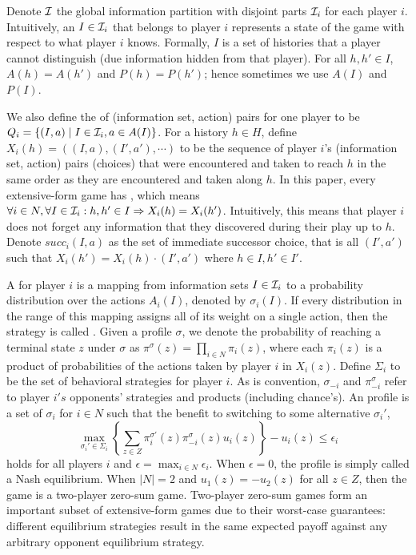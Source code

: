 \documentclass{aamas2014}
\begin{document}
Denote $\mathcal{I}$ the global information partition with disjoint parts $\mathcal{I}_i$ for each player $i$. Intuitively, an  
$I \in \mathcal{I}_i$ that belongs to player $i$ represents a state of the game with respect to what player $i$ knows. 
Formally, $I$ is a set of histories that a player cannot distinguish (due information hidden from that player). For all 
$h,h' \in I$, $A(h) = A(h')$ and $P(h) = P(h')$; hence sometimes we use $A(I)$ and $P(I)$. 

We also define the  of (information set, action) pairs for one player to be
$Q_i = \{ (I,a) \mid I \in \mathcal{I}_i, a \in A(I) \}$.
For a history $h \in H$, define
$X_i(h) = ((I,a), (I', a'), \cdots)$ to be the sequence of player $i$'s (information set,
action) pairs (choices) that were encountered and taken to reach $h$ in the same order as they are encountered
and taken along $h$. In this paper, every extensive-form game has , which means
$\forall i \in N, \forall I \in \mathcal{I}_i : h, h' \in I \Rightarrow X_i(h) = X_i(h')$. Intuitively,
this means that player $i$ does not forget any information that they discovered during their play
up to $h$. 
Denote $succ_i(I,a)$ as the set of immediate successor choice, that is 
all $(I',a')$ such that $X_i(h') = X_i(h) \cdot (I',a')$ where $h \in I, h' \in I'$.

A  for player $i$ is a mapping from information sets $I \in \mathcal{I}_i$
to a probability distribution over the actions $A_i(I)$, denoted by $\sigma_i(I)$. 
If every distribution in the range of this mapping assigns all of its weight on a single action, 
then the strategy is called . 
Given a profile $\sigma$, we denote the probability of reaching a terminal state $z$ under $\sigma$ as 
$\pi^\sigma(z) = \prod_{i \in N} \pi_i(z)$, where each $\pi_i(z)$ is a product of probabilities of the actions taken 
by player $i$ in $X_i(z)$. Define $\Sigma_i$ to be the set of behavioral strategies for player $i$. 
As is convention, $\sigma_{-i}$ and $\pi_{-i}^\sigma$ refer to player $i's$ opponents' strategies and products (including chance's).
An  profile is a set of $\sigma_i$ for $i \in N$ such that the benefit to switching to some 
alternative $\sigma_i'$,
\begin{equation}\label{eq:ne}
  \max_{\sigma_i' \in \Sigma_i} \left\{ \sum_{z \in Z} \pi_i^{\sigma'}(z) \pi_{-i}^\sigma(z) u_i(z) \right\} - u_i(z) \le \epsilon_i
\end{equation}
holds for all players $i$ and $\epsilon = \max_{i \in N} \epsilon_i$. When $\epsilon = 0$, the profile is simply called a Nash equilibrium. 
When $|N| = 2$ and $u_1(z) = -u_2(z)$ for all $z \in Z$, 
then the game is a two-player zero-sum game. Two-player zero-sum games form an important subset of extensive-form games due to their
worst-case guarantees: different equilibrium strategies result in the same expected payoff against any arbitrary opponent equilibrium strategy.
\end{document}
